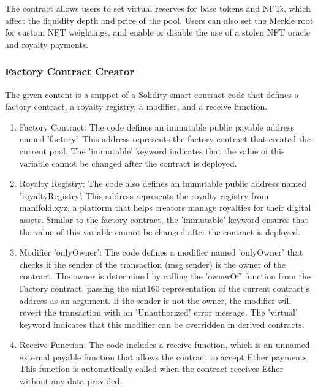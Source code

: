 The contract allows users to set virtual reserves for base tokens and
NFTs, which affect the liquidity depth and price of the pool. Users can
also set the Merkle root for custom NFT weightings, and enable or
disable the use of a stolen NFT oracle and royalty payments.

\hypertarget{factory-contract-creator}{%
\subsubsection{Factory Contract
Creator}\label{factory-contract-creator}}

The given content is a snippet of a Solidity smart contract code that
defines a factory contract, a royalty registry, a modifier, and a
receive function.

\begin{enumerate}
\def\labelenumi{\arabic{enumi}.}
\item
  Factory Contract: The code defines an immutable public payable address
  named 'factory'. This address represents the factory contract that
  created the current pool. The 'immutable' keyword indicates that the
  value of this variable cannot be changed after the contract is
  deployed.
\item
  Royalty Registry: The code also defines an immutable public address
  named 'royaltyRegistry'. This address represents the royalty registry
  from manifold.xyz, a platform that helps creators manage royalties for
  their digital assets. Similar to the factory contract, the 'immutable'
  keyword ensures that the value of this variable cannot be changed
  after the contract is deployed.
\item
  Modifier 'onlyOwner': The code defines a modifier named 'onlyOwner'
  that checks if the sender of the transaction (msg.sender) is the owner
  of the contract. The owner is determined by calling the 'ownerOf'
  function from the Factory contract, passing the uint160 representation
  of the current contract's address as an argument. If the sender is not
  the owner, the modifier will revert the transaction with an
  'Unauthorized' error message. The 'virtual' keyword indicates that
  this modifier can be overridden in derived contracts.
\item
  Receive Function: The code includes a receive function, which is an
  unnamed external payable function that allows the contract to accept
  Ether payments. This function is automatically called when the
  contract receives Ether without any data provided.
\end{enumerate}

